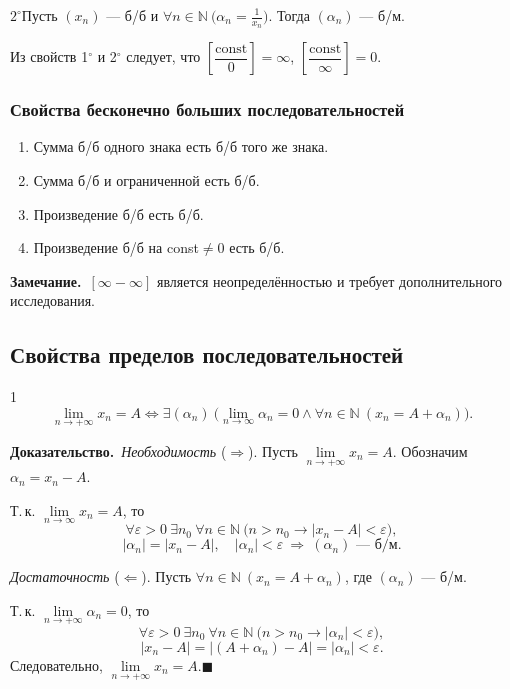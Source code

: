 \documentclass[a4paper,11pt]{article}
\newcommand{\zam}{\textbf{Замечание.}\ }
\newcommand{\dok}{\textbf{Доказательство.}\ }
\newcommand{\qedr}{\hfill$\blacksquare$}
\begin{document}
\begin{svoi}{$2^\circ$}Пусть $(x_n)$ --- б/б и
$\forall n \in \mathbb{N}\ \big(\alpha_n = \frac{1}{x_n}\big)$. Тогда $(\alpha_n)$ --- б/м.
\end{svoi}

Из свойств 1$^\circ$ и 2$^\circ$ следует, что
$\left[\dfrac{\mathrm{const}}{0}\right] = \infty$,
$\left[\dfrac{\mathrm{const}}{\infty}\right] = 0$.

\subsubsection{Свойства бесконечно больших последовательностей}

\begin{enumerate}
  \item Сумма б/б одного знака есть б/б того же знака.
  \item Сумма б/б и ограниченной есть б/б.
  \item Произведение б/б есть б/б.
  \item Произведение б/б на const${}\ne 0$ есть б/б.
\end{enumerate}

\zam $[\infty - \infty]$ является неопределённостью и требует
дополнительного исследования.

\subsection{Свойства пределов последовательностей}

\begin{teor}{1}
  \[
    \lim_{n \to +\infty} x_n = A \Leftrightarrow
    \exists (\alpha_n)\ \Big(\lim_{n \to \infty} \alpha_n = 0 \wedge
    \forall n \in \mathbb{N}\ (x_n = A + \alpha_n)\Big).
  \]
\end{teor}

\dok \textit{Необходимость} ($\Rightarrow$). Пусть
$\lim\limits_{n \to +\infty} x_n = A$. Обозначим $\alpha_n = x_n - A$.

Т.\,к. $\lim\limits_{n \to \infty} x_n = A$, то
\[
  \forall \varepsilon > 0\ \exists n_0\ \forall n \in \mathbb{N}\
  \big(n > n_0 \to |x_n - A| < \varepsilon\big),
\]
\[
  |\alpha_n| = |x_n - A|,\quad |\alpha_n| < \varepsilon
  \ \Longrightarrow\ (\alpha_n) \text{ --- б/м}.
\]

\textit{Достаточность} ($\Leftarrow$). Пусть
$\forall n \in \mathbb{N}\ (x_n = A + \alpha_n)$, где $(\alpha_n)$ --- б/м.

Т.\,к. $\lim\limits_{n \to +\infty} \alpha_n = 0$, то
\[
  \forall \varepsilon > 0\ \exists n_0\ \forall n \in \mathbb{N}\
  \big(n > n_0 \to |\alpha_n| < \varepsilon\big),
\]
\[
  |x_n - A| = |(A + \alpha_n) - A| = |\alpha_n| < \varepsilon.
\]
Следовательно, $\lim\limits_{n \to +\infty} x_n = A$.\qedr
\end{document}

